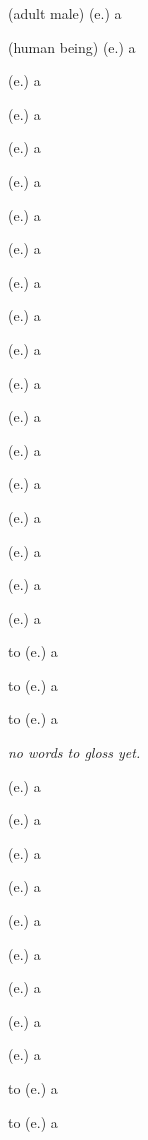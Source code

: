 \begin{glosses}
\par {} (adult male) (e.) {a}
\par {} (human being) (e.) {a}
\par {} (e.) {a}
\par {} (e.) {a}
\par {} (e.) {a}
\par {} (e.) {a}
\par {} (e.) {a}
\end{glosses}

\begin{glosses}
\par {} (e.) {a}
\par {} (e.) {a}
\par {} (e.) {a}
\par {} (e.) {a}
\par {} (e.) {a}
\par {} (e.) {a}
\par {} (e.) {a}
\par {} (e.) {a}
\par {} (e.) {a}
\end{glosses}

\begin{glosses}
\par {} (e.) {a}
\par {} (e.) {a}
\par {} (e.) {a}
\end{glosses}

\begin{glosses}
\par to  (e.) {a}
\par to  (e.) {a}
\par to  (e.) {a}
\end{glosses}

\begin{glosses}
\par \textit{no words to gloss yet.}
\end{glosses}

\begin{glosses}
\par {} (e.) {a}
\par {} (e.) {a}
\par {} (e.) {a}
\par {} (e.) {a}
\par {} (e.) {a}
\par {} (e.) {a}
\par {} (e.) {a}
\par {} (e.) {a}
\par {} (e.) {a}
\par to  (e.) {a}
\par to  (e.) {a}
\end{glosses}

